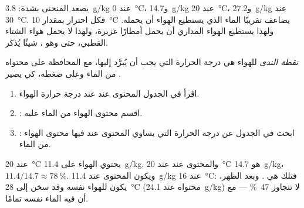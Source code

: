 يصعد المنحنى بشدة: \qty{3.8}{g/kg} عند \qty{0}{\degreeCelsius}،
و\qty{14.7}{g/kg} عند \qty{20}{\degreeCelsius}، و\qty{27.2}{g/kg} عند
\qty{30}{\degreeCelsius}. فكل احترار بمقدار \qty{10}{\degreeCelsius} يضاعف
تقريبًا الماء الذي يستطيع الهواء أن يحمله. ولهذا يستطيع الهواء المداري أن يحمل
أمطارًا غزيرة، ولهذا لا يحمل هواء الشتاء القطبي، حتى وهو ، شيئًا
يُذكر.

\begin{definition}\label{def:g10:why-clouds-form:dew-point}
\emph{نقطة الندى} للهواء هي درجة الحرارة التي يجب أن يُبرَّد
إليها، مع المحافظة على محتواه من الماء وعلى ضغطه، كي يصير
.
\end{definition}

\begin{method}\label{met:g10:why-clouds-form:table}
\begin{enumerate}
  \item اقرأ في الجدول المحتوى عند  عند درجة حرارة الهواء.
  \item {}: اقسم محتوى الهواء من الماء عليه.
  \item {}: ابحث في الجدول عن درجة الحرارة التي يساوي المحتوى عند
         فيها محتوى الهواء من الماء.
\end{enumerate}
\end{method}

\begin{example}\label{ex:g10:why-clouds-form:morning}
عند \qty{20}{\degreeCelsius} يحتوي الهواء على \qty{11.4}{g/kg}. والمحتوى عند
 عند \qty{20}{\degreeCelsius} هو \qty{14.7}{g/kg}، 
$11.4/14.7 \approx \qty{78}{\percent}$. ويكون المحتوى عند 
\qty{11.4}{g/kg} عند \qty{16}{\degreeCelsius}: فتلك هي . وبعد الظهر، يكون للهواء نفسه وقد سخن إلى \qty{28}{\degreeCelsius}
(محتواه عند  \qty{24.1}{g/kg})  لا تتجاوز
\qty{47}{\percent} --- مع أن فيه الماء نفسه تمامًا.
\end{example}

